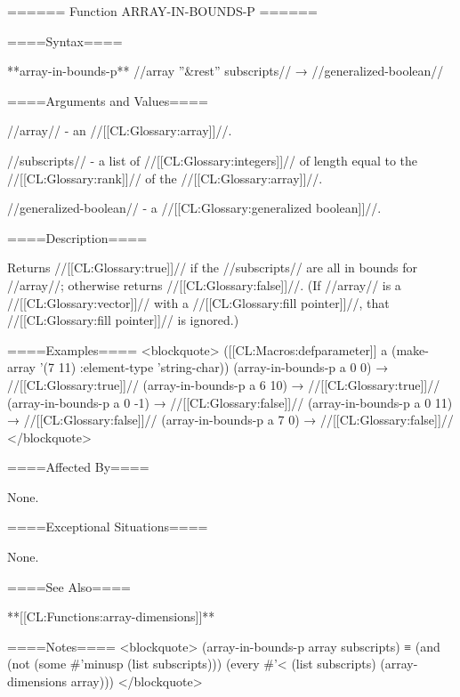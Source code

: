 ====== Function ARRAY-IN-BOUNDS-P ======

====Syntax====

**array-in-bounds-p** //array ''&rest'' subscripts// → //generalized-boolean//

====Arguments and Values====

//array// - an //[[CL:Glossary:array]]//.

//subscripts// - a list of //[[CL:Glossary:integers]]// of length equal to the //[[CL:Glossary:rank]]// of the //[[CL:Glossary:array]]//.

//generalized-boolean// - a //[[CL:Glossary:generalized boolean]]//.

====Description====

Returns //[[CL:Glossary:true]]// if the //subscripts// are all in bounds for //array//; otherwise returns //[[CL:Glossary:false]]//. (If //array// is a //[[CL:Glossary:vector]]// with a //[[CL:Glossary:fill pointer]]//, that //[[CL:Glossary:fill pointer]]// is ignored.)

====Examples==== <blockquote> ([[CL:Macros:defparameter]] a (make-array '(7 11) :element-type 'string-char)) (array-in-bounds-p a 0 0) → //[[CL:Glossary:true]]// (array-in-bounds-p a 6 10) → //[[CL:Glossary:true]]// (array-in-bounds-p a 0 -1) → //[[CL:Glossary:false]]// (array-in-bounds-p a 0 11) → //[[CL:Glossary:false]]// (array-in-bounds-p a 7 0) → //[[CL:Glossary:false]]// </blockquote>

====Affected By====

None.

====Exceptional Situations====

None.

====See Also====

**[[CL:Functions:array-dimensions]]**

====Notes==== <blockquote> (array-in-bounds-p array subscripts) ≡ (and (not (some #'minusp (list subscripts))) (every #'< (list subscripts) (array-dimensions array))) </blockquote>

